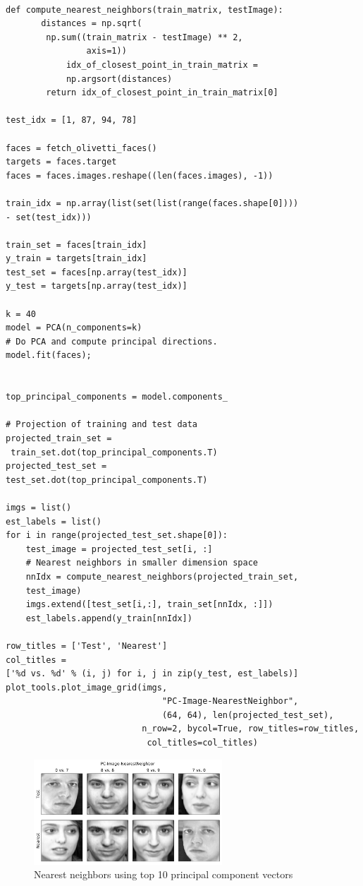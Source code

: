 \documentclass[12pt,twoside]{article}
\begin{document}
\begin{enumerate}
\begin{enumerate}
\begin{verbatim} 

def compute_nearest_neighbors(train_matrix, testImage):
	   distances = np.sqrt(
	   	np.sum((train_matrix - testImage) ** 2, 
	   			axis=1))
    	    idx_of_closest_point_in_train_matrix = 
	    	np.argsort(distances)
	    return idx_of_closest_point_in_train_matrix[0]

test_idx = [1, 87, 94, 78]

faces = fetch_olivetti_faces()
targets = faces.target
faces = faces.images.reshape((len(faces.images), -1))

train_idx = np.array(list(set(list(range(faces.shape[0]))) 
- set(test_idx)))

train_set = faces[train_idx]
y_train = targets[train_idx]
test_set = faces[np.array(test_idx)]
y_test = targets[np.array(test_idx)]

k = 40
model = PCA(n_components=k)
# Do PCA and compute principal directions.
model.fit(faces);


top_principal_components = model.components_

# Projection of training and test data
projected_train_set =
 train_set.dot(top_principal_components.T)
projected_test_set = 
test_set.dot(top_principal_components.T)

imgs = list()
est_labels = list()
for i in range(projected_test_set.shape[0]):
    test_image = projected_test_set[i, :]
    # Nearest neighbors in smaller dimension space
    nnIdx = compute_nearest_neighbors(projected_train_set, 
    test_image)
    imgs.extend([test_set[i,:], train_set[nnIdx, :]])
    est_labels.append(y_train[nnIdx])

row_titles = ['Test', 'Nearest']
col_titles = 
['%d vs. %d' % (i, j) for i, j in zip(y_test, est_labels)]
plot_tools.plot_image_grid(imgs,
                               "PC-Image-NearestNeighbor",
                               (64, 64), len(projected_test_set), 
                           n_row=2, bycol=True, row_titles=row_titles,
                            col_titles=col_titles)
\end{verbatim}

	\begin{figure}[H]
		\centering
		\includegraphics[width=200pt]{figures/PC-Image-NearestNeighbor.pdf}
		\caption{Nearest neighbors using top 10 principal component vectors}
		\label{fig8}
	\end{figure}



\end{enumerate}
\end{enumerate}
\end{document}
